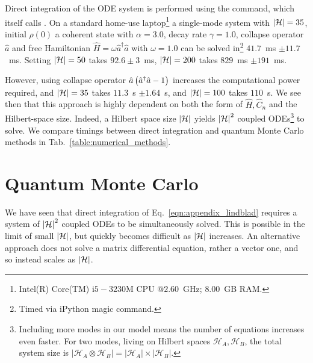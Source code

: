 Direct integration of the ODE system is performed using the  command, which itself calls . On a standard home-use laptop\footnote{Intel(R) Core(TM) i$5-3230$M CPU $@ 2.60$~GHz; $8.00$~GB RAM.} a single-mode system with $\left|\mathcal{H}\right| = 35$, initial $\rho\left(0\right)$ a coherent state with $\alpha = 3.0$, decay rate $\gamma = 1.0$, collapse operator $\hat{a}$ and free Hamiltonian $\hat{H} = \omega \hat{a}^\dagger \hat{a}$ with $\omega = 1.0$ can be solved in\footnote{Timed via iPython  magic command.} $41.7$~ms $\pm 11.7$~ms. Setting $\left|\mathcal{H}\right| = 50$ takes $92.6 \pm 3$~ms, $\left|\mathcal{H}\right| = 200$ takes $829$~ms $\pm 191$~ms.

However, using collapse operator $\hat{a}\left(\hat{a}^\dagger \hat{a} - 1\right)$ increases the computational power required, %
and $\left|\mathcal{H}\right| = 35$ takes $11.3$~s $\pm 1.64$~s, and $\left|\mathcal{H}\right|=100$ takes $110$~s. %
We see then that this approach is highly dependent on both the form of $\hat{H}, \hat{C}_n$ and the Hilbert-space size. Indeed, a Hilbert space size $\left|\mathcal{H}\right|$ yields $\left|\mathcal{H}\right|^2$ coupled ODEs\footnote{Including more modes in our model means the number of equations increases even faster. For two modes, living on Hilbert spaces $\mathcal{H}_A, \mathcal{H}_B$, the total system size is $\left| \mathcal{H}_A \otimes \mathcal{H}_B \right| = \left|\mathcal{H}_A\right| \times \left| \mathcal{H}_B\right|$.} to solve. We compare timings between direct integration and quantum Monte Carlo methods in Tab.~\ref{table:numerical_methods}.



\section{Quantum Monte Carlo}\label{appendix:monte_carlo}
We have seen that direct integration of Eq.~\ref{eqn:appendix_lindblad} requires a system of $\left|\mathcal{H}\right|^2$ coupled ODEs to be simultaneously solved. This is possible in the limit of small $\left|\mathcal{H}\right|$, but quickly becomes difficult as $\left|\mathcal{H}\right|$ increases. An alternative approach does not solve a matrix differential equation, rather a vector one, and so instead scales as $\left|\mathcal{H}\right|$.


